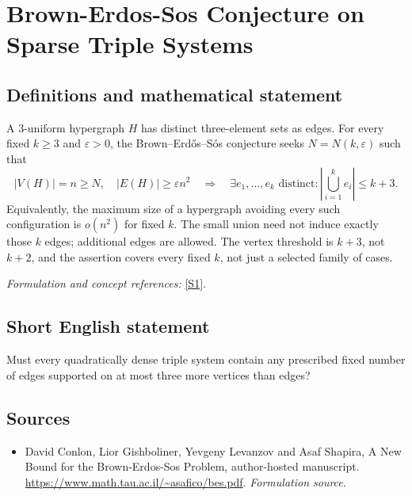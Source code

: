 \documentclass[11pt]{article}
\begin{document}
\section*{\texorpdfstring{Brown-Erdos-Sos Conjecture on Sparse Triple Systems}{Brown-Erdos-Sos Conjecture on Sparse Triple Systems}}\label{30006917}
\subsection{Definitions and mathematical statement}
A $3$-uniform hypergraph $H$ has distinct three-element sets as edges. For every fixed $k\ge3$ and ${\varepsilon}>0$, the Brown--Erd\H{o}s--S\'os conjecture seeks $N=N(k,{\varepsilon})$ such that
\[
 |V(H)|=n\ge N,\quad |E(H)|\ge{\varepsilon} n^2
 \quad\Longrightarrow\quad
 \exists e_1,\ldots,e_k\text{ distinct}:\left|\bigcup_{i=1}^k e_i\right|\le k+3.
\]
Equivalently, the maximum size of a hypergraph avoiding every such configuration is $o(n^2)$ for fixed $k$. The small union need not induce exactly those $k$ edges; additional edges are allowed. The vertex threshold is $k+3$, not $k+2$, and the assertion covers every fixed $k$, not just a selected family of cases.
\par\smallskip\textit{Formulation and concept references:} \href{https://www.math.tau.ac.il/~asafico/bes.pdf}{[S1]}.

\subsection{Short English statement}
Must every quadratically dense triple system contain any prescribed fixed number of edges supported on at most three more vertices than edges?
\subsection{Sources}
\begin{itemize}
\item[S1]David Conlon, Lior Gishboliner, Yevgeny Levanzov and Asaf Shapira, A New Bound for the Brown-Erdos-Sos Problem, author-hosted manuscript.
\url{https://www.math.tau.ac.il/~asafico/bes.pdf}.
\textit{Formulation source.}
\end{itemize}
\end{document}
